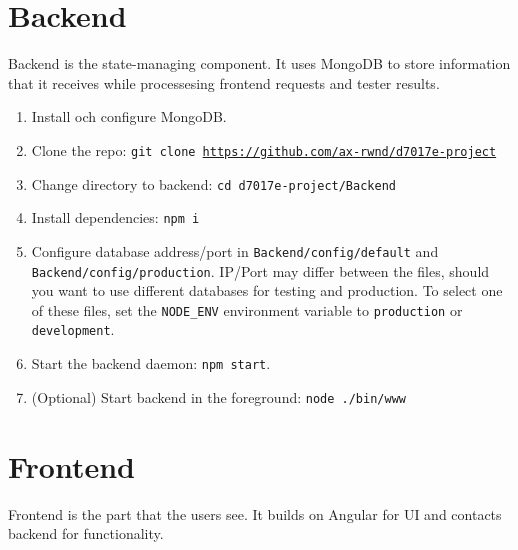 \section{Backend}
Backend is the state-managing component. It uses MongoDB to store information that it receives while processesing frontend requests and tester results.
\begin{enumerate}
\item Install och configure MongoDB.
\item Clone the repo: \texttt{git clone \url{https://github.com/ax-rwnd/d7017e-project}}
\item Change directory to backend: \texttt{cd d7017e-project/Backend}
\item Install dependencies: \texttt{npm i}
\item Configure database address/port in \texttt{Backend/config/default} and \\
\texttt{Backend/config/production}. IP/Port may differ between the files, should you want to use different databases for testing and production. To select one of these files, set the \texttt{NODE\_ENV} environment variable to \texttt{production} or \texttt{development}.
\item Start the backend daemon: \texttt{npm start}.
\item (Optional) Start backend in the foreground: \texttt{node ./bin/www}
\end{enumerate}

\section{Frontend}
Frontend is the part that the users see. It builds on Angular for UI and contacts backend for functionality.

